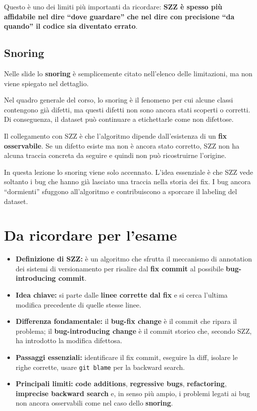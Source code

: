 \begin{notaesame}
Questo è uno dei limiti più importanti da ricordare: \textbf{SZZ è spesso più affidabile nel dire ``dove guardare'' che nel dire con precisione ``da quando'' il codice sia diventato errato}.
\end{notaesame}

\subsection{Snoring}

\begin{notaslide}
Nelle slide lo \textbf{snoring} è semplicemente citato nell'elenco delle limitazioni, ma non viene spiegato nel dettaglio.
\end{notaslide}

Nel quadro generale del corso, lo snoring è il fenomeno per cui alcune classi contengono già difetti, ma questi difetti non sono ancora stati scoperti o corretti. Di conseguenza, il dataset può continuare a etichettarle come non difettose.

Il collegamento con SZZ è che l'algoritmo dipende dall'esistenza di un \textbf{fix osservabile}. Se un difetto esiste ma non è ancora stato corretto, SZZ non ha alcuna traccia concreta da seguire e quindi non può ricostruirne l'origine.

\begin{notaprof}
In questa lezione lo snoring viene solo accennato. L'idea essenziale è che SZZ vede soltanto i bug che hanno già lasciato una traccia nella storia dei fix. I bug ancora ``dormienti'' sfuggono all'algoritmo e contribuiscono a sporcare il labeling del dataset.
\end{notaprof}

\section{Da ricordare per l'esame}

\begin{itemize}
    \item \textbf{Definizione di SZZ:} è un algoritmo che sfrutta il meccanismo di annotation dei sistemi di versionamento per risalire dal \textbf{fix commit} al possibile \textbf{bug-introducing commit}.
    \item \textbf{Idea chiave:} si parte dalle \textbf{linee corrette dal fix} e si cerca l'ultima modifica precedente di quelle stesse linee.
    \item \textbf{Differenza fondamentale:} il \textbf{bug-fix change} è il commit che ripara il problema; il \textbf{bug-introducing change} è il commit storico che, secondo SZZ, ha introdotto la modifica difettosa.
    \item \textbf{Passaggi essenziali:} identificare il fix commit, eseguire la diff, isolare le righe corrette, usare \texttt{git blame} per la backward search.
    \item \textbf{Principali limiti:} \textbf{code additions}, \textbf{regressive bugs}, \textbf{refactoring}, \textbf{imprecise backward search} e, in senso più ampio, i problemi legati ai bug non ancora osservabili come nel caso dello \textbf{snoring}.
\end{itemize}